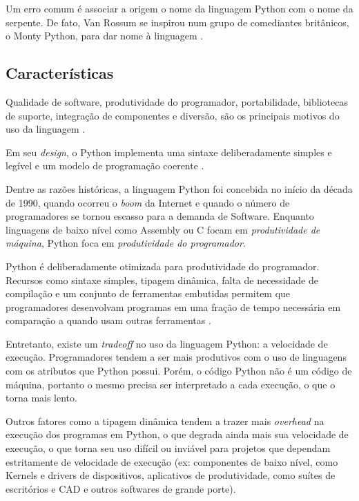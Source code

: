 Um erro comum é associar a origem o nome da linguagem Python com o nome da serpente. De fato, Van Rossum se inspirou num grupo de comediantes britânicos, o Monty Python, para dar nome à linguagem \cite{pythonfaq} . %



\subsection{Características}
Qualidade de software, produtividade do programador, portabilidade, bibliotecas de suporte, integração de componentes e diversão, são os principais motivos do uso da linguagem \cite{learningpython}. %

Em seu \emph{design}, o Python implementa uma sintaxe deliberadamente simples e legível e um modelo de programação coerente \cite{learningpython}. %

Dentre as razões históricas, a linguagem Python foi concebida no início da década de 1990, quando ocorreu o \emph{boom} da Internet e quando o número de programadores se tornou escasso para a demanda de Software. Enquanto linguagens de baixo nível como Assembly ou C focam em \emph{produtividade de máquina}, Python foca em \emph{produtividade do programador}. 

Python é deliberadamente otimizada para produtividade do programador. Recursos como sintaxe simples, tipagem dinâmica, falta de necessidade de compilação e um conjunto de ferramentas embutidas permitem que programadores desenvolvam programas em uma fração de tempo necessária em comparação a quando usam outras ferramentas \cite{learningpython}. %

Entretanto, existe um \emph{tradeoff} no uso da linguagem Python: a velocidade de execução. Programadores tendem a ser mais produtivos com o uso de linguagens com os atributos que Python possui. Porém, o código Python não é um código de máquina, portanto o mesmo precisa ser interpretado a cada execução, o que o torna mais lento. 

Outros fatores como a tipagem dinâmica tendem a trazer mais \emph{overhead} na execução dos programas em Python, o que degrada ainda mais sua velocidade de execução, o que torna seu uso difícil ou inviável para projetos que dependam estritamente de velocidade de execução (ex: componentes de baixo nível, como Kernels e drivers de dispositivos, aplicativos de produtividade, como suítes de escritórios e CAD e outros softwares de grande porte).

